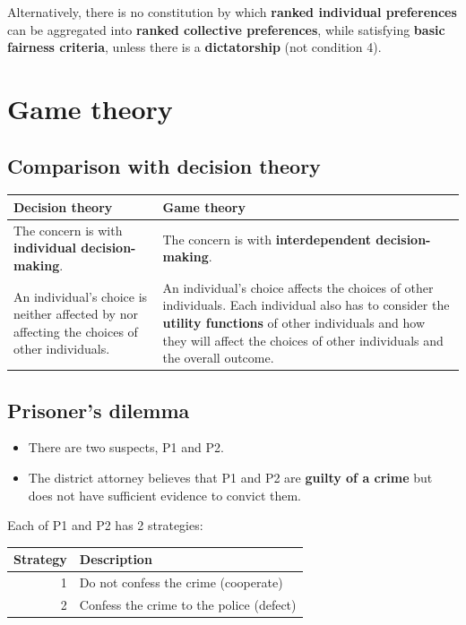 \documentclass[11pt]{article}
\begin{document}
Alternatively, there is no constitution by which \textbf{ranked individual preferences} can be aggregated into \textbf{ranked collective preferences}, while satisfying \textbf{basic fairness criteria}, unless there is a \textbf{dictatorship} (not condition 4).
\section{Game theory}
\label{sec:org9026684}

\subsection{Comparison with decision theory}
\label{sec:org8ee3234}
\begin{center}
\begin{tabularx}{\textwidth}{|X|X|}
\hline
Decision theory & Game theory\\
\hline
The concern is with \textbf{individual decision-making}. & The concern is with \textbf{interdependent decision-making}.\\
\hline
An individual's choice is neither affected by nor affecting the choices of other individuals. & An individual's choice affects the choices of other individuals. Each individual also has to consider the \textbf{utility functions} of other individuals and how they will affect the choices of other individuals and the overall outcome.\\
\hline
\end{tabularx}
\end{center}
\subsection{Prisoner's dilemma}
\label{sec:org13843d7}
\begin{itemize}
\item There are two suspects, P1 and P2.
\item The district attorney believes that P1 and P2 are \textbf{guilty of a crime} but does not have sufficient evidence to convict them.
\end{itemize}

Each of P1 and P2 has 2 strategies:
\begin{center}
\begin{tabular}{r|l}
Strategy & Description\\
\hline
1 & Do not confess the crime (cooperate)\\
2 & Confess the crime to the police (defect)\\
\end{tabular}
\end{center}
\end{document}
